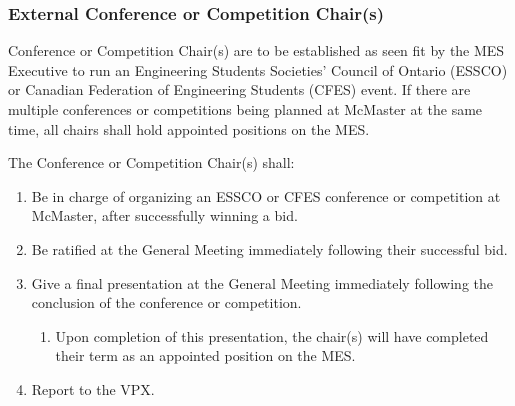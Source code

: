 
\subsubsection{External Conference or Competition Chair(s)}
\label{external-conference-or-competition-chairs}
Conference or Competition Chair(s) are to be established as seen fit by
the MES Executive to run an Engineering Students Societies' Council of
Ontario (ESSCO) or Canadian Federation of Engineering Students (CFES)
event. If there are multiple conferences or competitions being planned
at McMaster at the same time, all chairs shall hold appointed positions
on the MES.

The Conference or Competition Chair(s) shall:

\begin{enumerate}
 \item
  Be in charge of organizing an ESSCO or CFES conference or competition at McMaster, after successfully winning a bid.
 \item
  Be ratified at the General Meeting immediately following their successful bid.
 \item
  Give a final presentation at the General Meeting immediately following the conclusion of the conference or competition.

  \begin{enumerate}
   \item
    Upon completion of this presentation, the chair(s) will have completed their term as an appointed position on the MES.
  \end{enumerate}
 \item
  Report to the VPX.

\end{enumerate}

